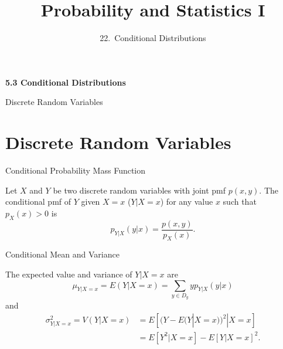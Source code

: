 

\newcommand{\lecturenum}{22}

\title[SS2857]{Probability and Statistics I}
\subtitle{\lecturenum.~Conditional Distributions}

\date{}






{

\begin{frame}
  \addtocounter{framenumber}{-1}

  \maketitle
\end{frame}
}

\begin{frame}
  \frametitle{}
  
  \begin{center}
    \Large{\textbf{5.3 Conditional Distributions}}

    \bigskip

    \Large{Discrete Random Variables}
  \end{center}
  
\end{frame}

\section{Discrete Random Variables}
\label{sec:two-discrete-random}



\begin{frame}

  \begin{block}{Conditional Probability Mass Function}
    
    Let $X$ and $Y$ be two discrete random variables with joint pmf $p(x,y)$. The conditional pmf of $Y$ given $X=x$ ($Y|X=x$) for any value $x$ such that $p_X(x)>0$ is
    \[
      p_{Y|X}(y|x)=\frac{p(x,y)}{p_X(x)}.
    \]
  \end{block}
\end{frame}

\begin{frame}

  \begin{block}{Conditional Mean and Variance}
    
    The expected value and variance of $Y|X=x$ are
    \[
      \mu_{Y|X=x}=E(Y|X=x)=\sum_{y\in D_y} yp_{Y|X}(y|x)
    \]
    and
    \begin{align*}
      \sigma^2_{Y|X=x}=V(Y|X=x)&=E[(Y-E(Y|X=x))^2|X=x]\\
                   &=E[Y^2|X=x]-E[Y|X=x]^2.
    \end{align*}
  \end{block}
\end{frame}

